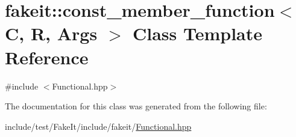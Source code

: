 \hypertarget{classfakeit_1_1const__member__function}{}\section{fakeit\+::const\+\_\+member\+\_\+function$<$ C, R, Args $>$ Class Template Reference}
\label{classfakeit_1_1const__member__function}


{\ttfamily \#include $<$Functional.\+hpp$>$}



The documentation for this class was generated from the following file\+:\begin{DoxyCompactItemize}
\item 
include/test/\+Fake\+It/include/fakeit/\mbox{\hyperlink{Functional_8hpp}{Functional.\+hpp}}\end{DoxyCompactItemize}
